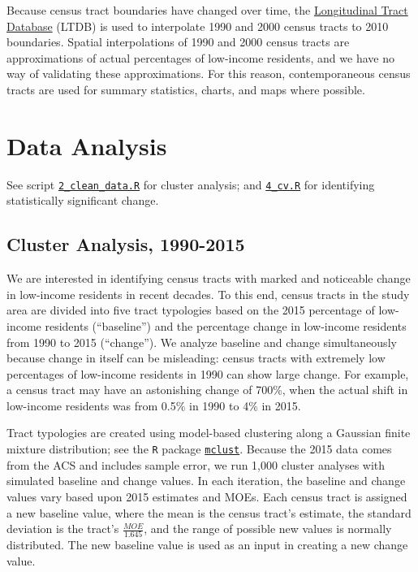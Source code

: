 \documentclass[paper=letterpaper, fontsize=11pt]{scrartcl}
\begin{document}
Because census tract boundaries have changed over time, the \href{https://s4.ad.brown.edu/projects/diversity/researcher/bridging.htm}{Longitudinal Tract Database} (LTDB) is used to interpolate 1990 and 2000 census tracts to 2010 boundaries. Spatial interpolations of 1990 and 2000 census tracts are approximations of actual percentages of low-income residents, and we have no way of validating these approximations. For this reason, contemporaneous census tracts are used for summary statistics, charts, and maps where possible.

\section{Data Analysis}
See script \href{https://github.com/addisonlarson/SoP/blob/master/2_clusters.R}{\texttt{2\_clean\_data.R}} for cluster analysis; and \href{https://github.com/addisonlarson/SoP/blob/master/4_cv.R}{\texttt{4\_cv.R}} for identifying statistically significant change.

\subsection{Cluster Analysis, 1990-2015}
We are interested in identifying census tracts with marked and noticeable change in low-income residents in recent decades. To this end, census tracts in the study area are divided into five tract typologies based on the 2015 percentage of low-income residents (``baseline'') and the percentage change in low-income residents from 1990 to 2015 (``change''). We analyze baseline and change simultaneously because change in itself can be misleading: census tracts with extremely low percentages of low-income residents in 1990 can show large change. For example, a census tract may have an astonishing change of 700\%, when the actual shift in low-income residents was from 0.5\% in 1990 to 4\% in 2015.

Tract typologies are created using model-based clustering along a Gaussian finite mixture distribution; see the \texttt{R} package \href{https://cran.r-project.org/web/packages/mclust/index.html}{\texttt{mclust}}. Because the 2015 data comes from the ACS and includes sample error, we run 1,000 cluster analyses with simulated baseline and change values. In each iteration, the baseline and change values vary based upon 2015 estimates and MOEs. Each census tract is assigned a new baseline value, where the mean is the census tract's estimate, the standard deviation is the tract's $\frac{MOE}{1.645}$, and the range of possible new values is normally distributed. The new baseline value is used as an input in creating a new change value.
\end{document}
